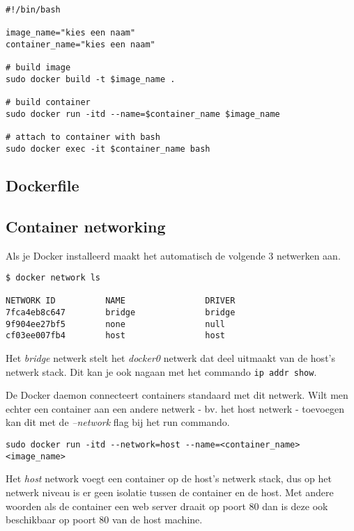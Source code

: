 \begin{verbatim}
#!/bin/bash

image_name="kies een naam"
container_name="kies een naam"

# build image
sudo docker build -t $image_name .

# build container
sudo docker run -itd --name=$container_name $image_name

# attach to container with bash
sudo docker exec -it $container_name bash

\end{verbatim}

\subsection{Dockerfile}


\subsection{Container networking}
Als je Docker installeerd maakt het automatisch de volgende 3 netwerken aan.

\begin{verbatim}
$ docker network ls

NETWORK ID          NAME                DRIVER
7fca4eb8c647        bridge              bridge
9f904ee27bf5        none                null
cf03ee007fb4        host                host
\end{verbatim}

Het \textit{bridge} netwerk stelt het \textit{docker0} netwerk dat deel uitmaakt van de host's netwerk stack. Dit kan je ook nagaan met het commando \texttt{ip addr show}.

De Docker daemon connecteert containers standaard met dit netwerk. Wilt men echter een container aan een andere netwerk - bv. het host netwerk - toevoegen kan dit met de \textit{--network} flag bij het run commando.

\begin{verbatim}
sudo docker run -itd --network=host --name=<container_name> <image_name>
\end{verbatim}

Het \textit{host} network voegt een container op de host's netwerk stack, dus op het netwerk niveau is er geen isolatie tussen de container en de host. Met andere woorden als de container een web server draait op poort 80 dan is deze ook beschikbaar op poort 80 van de host machine.